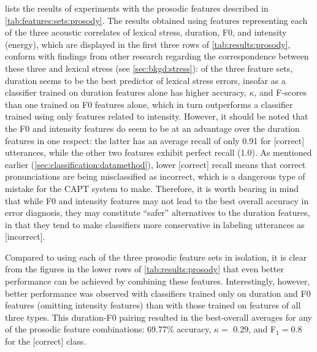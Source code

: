 		 lists the results of experiments with the prosodic features described in \cref{tab:features:sets:prosody}. The results obtained using features representing each of the three acoustic correlates of lexical stress, duration, F0, and intensity (energy), which are displayed in the first three rows of \cref{tab:results:prosody}, conform with findings from other research regarding the correspondence between these three  and lexical stress (see \cref{sec:bkgd:stress}): of the three feature sets, duration seems to be the best predictor of lexical stress errors, insofar as a classifier trained on duration features alone has higher accuracy, $\kappa$, and F-scores than one trained on F0 features alone, which in turn outperforms a classifier trained using only features related to intensity. However, it should be noted that the F0 and intensity features do seem to be at an advantage over the duration features in one respect: the latter has an average recall of only 0.91 for [correct] utterances, while the other two features exhibit perfect recall (1.0). As mentioned earlier (\cref{sec:classification:datamethod}), lower [correct] recall means that correct pronunciations are being misclassified as incorrect, which is a dangerous type of mistake for the CAPT system to make. Therefore, it is worth bearing in mind that while F0 and intensity features may not lead to the best overall accuracy in error diagnosis, they may constitute ``safer'' alternatives to the duration features, in that they tend to make classifiers more conservative in labeling utterances as [incorrect]. 
		
		Compared to using each of the three prosodic feature sets in isolation, it is clear from the figures in the lower rows of \cref{tab:results:prosody} that even better performance can be achieved by combining these features. Interestingly, however, 
		better performance was observed with classifiers trained only on duration and F0 features (omitting intensity features) than with those trained on features of all three types.
		This duration-F0 pairing resulted in the best-overall averages for any of the prosodic feature combinations: 69.77\% accuracy, $\kappa = $ 0.29, and F$_1 = 0.8$ for the [correct] class.
		
		
		
